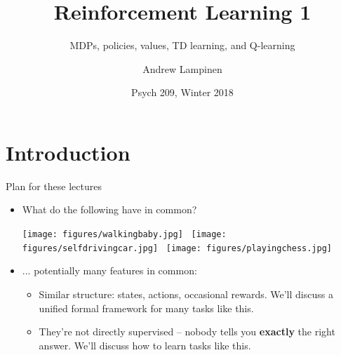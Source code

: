 \documentclass{beamer}
\begin{document}
\title{Reinforcement Learning 1}
\subtitle{MDPs, policies, values, TD learning, and Q-learning}
\author{Andrew Lampinen}
\date{Psych 209, Winter 2018}
\frame{\titlepage}


\section{Introduction}
\begin{frame}{Plan for these lectures}
\begin{itemize}
    \item What do the following have in common?
    \begin{center}
        \texttt{[image: figures/walkingbaby.jpg]}~
        \texttt{[image: figures/selfdrivingcar.jpg]}~
        \texttt{[image: figures/playingchess.jpg]}
    \end{center}
    \item<2-> ... potentially many features in common:
    \begin{itemize} 
        \item<3-> Similar structure: states, actions, occasional rewards. We'll discuss a unified formal framework for many tasks like this. 
        \item<4-> They're not directly supervised -- nobody tells you \textbf{exactly} the right answer. We'll discuss how to learn tasks like this. 
    \end{itemize}
    
\end{itemize}
\end{frame}
\end{document}
